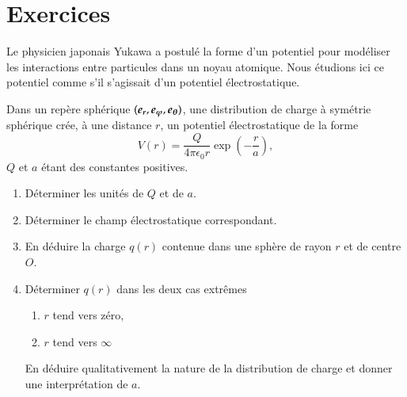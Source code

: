 \section{Exercices}
\begin{exocor}
	Le physicien japonais Yukawa a postulé la forme d'un potentiel pour modéliser
	les interactions entre particules dans un noyau atomique. Nous étudions
	ici ce potentiel comme s'il s'agissait d'un potentiel électrostatique.

	Dans un repère sphérique $(\er, \ephi, \etheta)$, une distribution de 
	charge à symétrie sphérique crée, à une distance $r$,
	un potentiel électrostatique de la forme
	\begin{equation}
		V(r) = \dfrac{Q}{4 \pi \epsilon_0 r} \exp\left(-\dfrac{r}{a}\right),
	\end{equation}
	$Q$ et $a$ étant des constantes positives.

	\begin{enumerate}
		\item Déterminer les unités de $Q$ et de $a$.
		\item Déterminer le champ électrostatique correspondant.
		\item En déduire la charge $q(r)$ contenue dans une sphère de 
		  rayon $r$ et de centre $O$.
		\item Déterminer $q(r)$ dans les deux cas extrêmes
			\begin{enumerate}
				\item $r$ tend vers zéro,
				\item $r$ tend vers $\infty$
			\end{enumerate}
		 En déduire qualitativement la nature de la distribution de charge
		 et donner une interprétation de $a$.
 	\end{enumerate}
\end{exocor}

